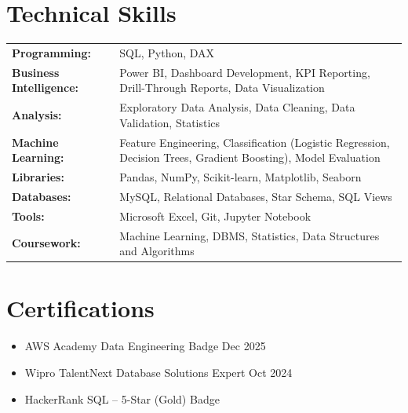 \documentclass[a4paper,12pt]{article}
\begin{document}
\section{Technical Skills}
\begin{tabularx}{\linewidth}{@{}l X@{}}
\textbf{Programming:} & \normalsize{SQL, Python, DAX}\\
\textbf{Business Intelligence:} & \normalsize{Power BI, Dashboard Development, KPI Reporting, Drill-Through Reports, Data Visualization}\\
\textbf{Analysis:} & \normalsize{Exploratory Data Analysis, Data Cleaning, Data Validation, Statistics}\\
\textbf{Machine Learning:} & \normalsize{Feature Engineering, Classification (Logistic Regression, Decision Trees, Gradient Boosting), Model Evaluation}\\
\textbf{Libraries:} & \normalsize{Pandas, NumPy, Scikit-learn, Matplotlib, Seaborn}\\
\textbf{Databases:} & \normalsize{MySQL, Relational Databases, Star Schema, SQL Views}\\
\textbf{Tools:} & \normalsize{Microsoft Excel, Git, Jupyter Notebook}\\
\textbf{Coursework:} & \normalsize{Machine Learning, DBMS, Statistics, Data Structures and Algorithms}\\

\end{tabularx}


\section{Certifications}

\begin{itemize}[leftmargin=1em, itemsep=10pt, label=--]
    \item AWS Academy Data Engineering Badge \hfill Dec 2025
    \item Wipro TalentNext Database Solutions Expert \hfill Oct 2024
    \item HackerRank SQL -- 5-Star (Gold) Badge
\end{itemize}


\vfill
\center
\end{document}
